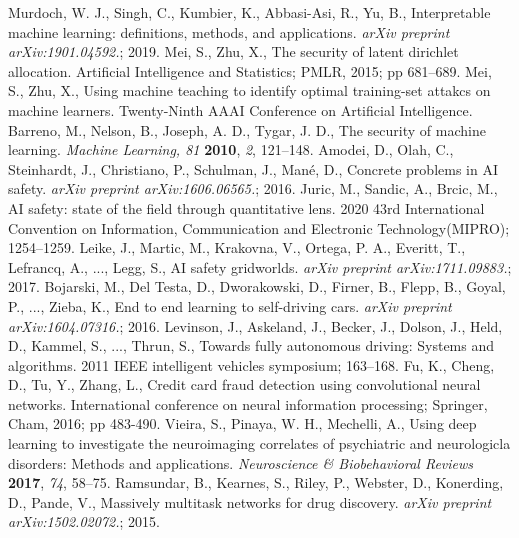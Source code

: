 \documentclass[symmetry,article,submit,moreauthors,pdftex]{Definitions/mdpi}
\begin{document}
\begin{thebibliography}{999}
Murdoch, W. J., Singh, C., Kumbier, K., Abbasi-Asi, R., Yu, B., Interpretable machine learning: definitions, methods, and applications. \textit{arXiv preprint arXiv:1901.04592.}; 2019.
Mei, S., Zhu, X., The security of latent dirichlet allocation. Artificial Intelligence and Statistics; PMLR, 2015; pp 681--689.
Mei, S., Zhu, X., Using machine teaching to identify optimal training-set attakcs on machine learners. Twenty-Ninth AAAI Conference on Artificial Intelligence.
Barreno, M., Nelson, B., Joseph, A. D., Tygar, J. D.,  The security of machine learning. {\em Machine Learning, 81} {\bf 2010}, {\em 2}, 121--148.
Amodei, D., Olah, C., Steinhardt, J., Christiano, P., Schulman, J., Mané, D., Concrete problems in AI safety. \textit{arXiv preprint arXiv:1606.06565.}; 2016.
Juric, M., Sandic, A., Brcic, M., AI safety: state of the field through quantitative lens. 2020 43rd International Convention on Information, Communication and Electronic Technology(MIPRO); 1254--1259.
Leike, J., Martic, M., Krakovna, V., Ortega, P. A., Everitt, T., Lefrancq, A., ..., Legg, S., AI safety gridworlds. \textit{arXiv preprint arXiv:1711.09883.}; 2017.
Bojarski, M., Del Testa, D., Dworakowski, D., Firner, B., Flepp, B., Goyal, P., ..., Zieba, K., End to end learning to self-driving cars. \textit{arXiv preprint arXiv:1604.07316.}; 2016.
Levinson, J., Askeland, J., Becker, J., Dolson, J., Held, D., Kammel, S., ..., Thrun, S., Towards fully autonomous driving: Systems and algorithms. 2011 IEEE intelligent vehicles symposium; 163--168.
Fu, K., Cheng, D., Tu, Y., Zhang, L., Credit card fraud detection using convolutional neural networks. International conference on neural information processing; Springer, Cham, 2016; pp 483-490.
Vieira, S., Pinaya, W. H., Mechelli, A., Using deep learning to investigate the neuroimaging correlates of psychiatric and neurologicla disorders: Methods and applications. {\em Neuroscience \& Biobehavioral Reviews} {\bf 2017}, {\em 74}, 58--75.
Ramsundar, B., Kearnes, S., Riley, P., Webster, D., Konerding, D., Pande, V., Massively multitask networks for drug discovery. \textit{arXiv preprint arXiv:1502.02072.}; 2015.

\end{thebibliography}
\end{document}
